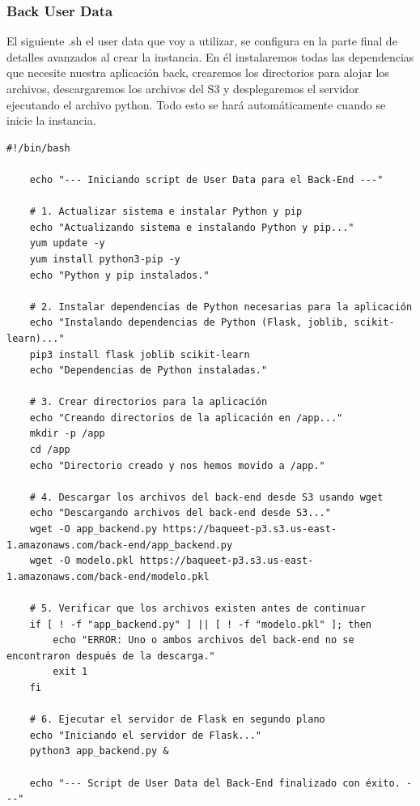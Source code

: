 \documentclass{article}
\begin{document}
	\subsubsection{Back User Data}
	El siguiente .sh el user data que voy a utilizar, se configura en la parte final de detalles avanzados al crear la instancia. En él instalaremos todas las dependencias que necesite nuestra aplicación back, crearemos los directorios para alojar los archivos, descargaremos los archivos del S3 y desplegaremos el servidor ejecutando el archivo python. Todo esto se hará automáticamente cuando se inicie la instancia. 

	\begin{lstlisting}[style=python-style, caption= back user data sh]
	#!/bin/bash

	echo "--- Iniciando script de User Data para el Back-End ---"

	# 1. Actualizar sistema e instalar Python y pip
	echo "Actualizando sistema e instalando Python y pip..."
	yum update -y
	yum install python3-pip -y
	echo "Python y pip instalados."

	# 2. Instalar dependencias de Python necesarias para la aplicación
	echo "Instalando dependencias de Python (Flask, joblib, scikit-learn)..."
	pip3 install flask joblib scikit-learn
	echo "Dependencias de Python instaladas."

	# 3. Crear directorios para la aplicación
	echo "Creando directorios de la aplicación en /app..."
	mkdir -p /app
	cd /app
	echo "Directorio creado y nos hemos movido a /app."

	# 4. Descargar los archivos del back-end desde S3 usando wget
	echo "Descargando archivos del back-end desde S3..."
	wget -O app_backend.py https://baqueet-p3.s3.us-east-1.amazonaws.com/back-end/app_backend.py
	wget -O modelo.pkl https://baqueet-p3.s3.us-east-1.amazonaws.com/back-end/modelo.pkl

	# 5. Verificar que los archivos existen antes de continuar
	if [ ! -f "app_backend.py" ] || [ ! -f "modelo.pkl" ]; then
		echo "ERROR: Uno o ambos archivos del back-end no se encontraron después de la descarga."
		exit 1
	fi

	# 6. Ejecutar el servidor de Flask en segundo plano
	echo "Iniciando el servidor de Flask..."
	python3 app_backend.py &

	echo "--- Script de User Data del Back-End finalizado con éxito. ---"

	\end{lstlisting}
\end{document}
